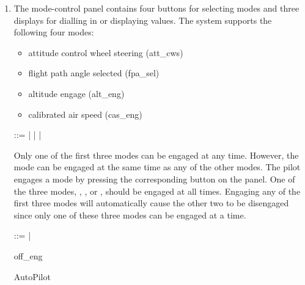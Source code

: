 \documentclass{article}
\begin{document}
\begin{enumerate}
\item The mode-control panel contains four buttons for selecting modes and three displays for
dialling in or displaying values. The system supports the following four modes:

\begin{itemize}
\item attitude control wheel steering (att\_cws)
\item flight path angle selected (fpa\_sel)
\item altitude engage (alt\_eng)
\item calibrated air speed (cas\_eng)
\end{itemize}

\begin{zed}
 ::=  |   |  | \\
\end{zed}

Only one of the first three modes can be engaged at any time. However, the  mode
can be engaged at the same time as any of the other modes. The pilot engages a mode by pressing
the corresponding button on the panel. One of the three modes, , , or ,
should be engaged at all times. Engaging any of the first three modes will automatically cause the
other two to be disengaged since only one of these three modes can be engaged at a time.

\begin{zed}
 ::=  | 
\end{zed}

\begin{schema}{off\_eng}
\where
{}
\end{schema}


\begin{schema}{AutoPilot}
 \\
 \\
 \\
\end{schema}


\end{enumerate}
\end{document}
